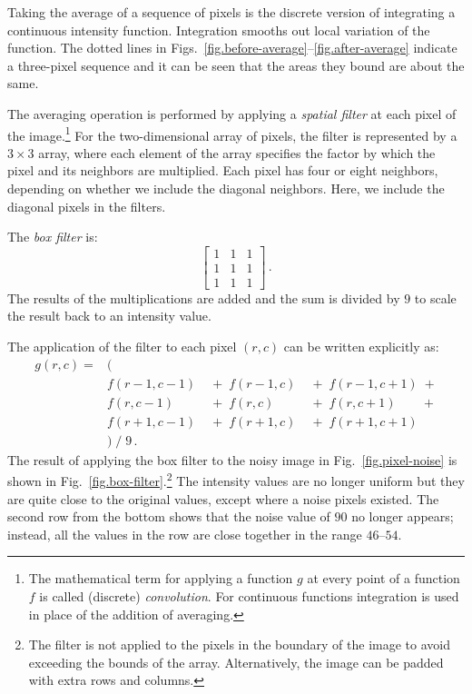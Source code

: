 Taking the average of a sequence of pixels is the discrete version of integrating a continuous intensity function. Integration smooths out local variation of the function. The dotted lines in Figs.~\ref{fig.before-average}--\ref{fig.after-average} indicate a three-pixel sequence and it can be seen that the areas they bound are about the same.

The averaging operation is performed by applying a \emph{spatial filter} at each pixel of the image.\footnote{The mathematical term for applying a function $g$ at every point of a function $f$ is called (discrete) \emph{convolution}. For continuous functions integration is used in place of the addition of averaging.} For the two-dimensional array of pixels, the filter is represented by a $3\times 3$ array, where each element of the array specifies the factor by which the pixel and its neighbors are multiplied. Each pixel has four or eight neighbors, depending on whether we include the diagonal neighbors. Here, we include the diagonal pixels in the filters.

The \emph{box filter} is:
\[
\left[
\begin{array}{ccc}
1 & 1 & 1\\
1 & 1 & 1\\
1 & 1 & 1
\end{array}
\right]\,.
\]
The results of the multiplications are added and the sum is divided by $9$ to scale the result back to an intensity value.

The application of the filter to each pixel $(r,c)$ can be written explicitly as:
\[
\begin{array}{llll}
g(r,c) = &(\\
&f(r-1,c-1) & \;+\; f(r-1,c) & \;+\; f(r-1,c+1) \;+\\
&f(r,c-1) & \;+\; f(r,c) & \;+\; f(r,c+1) \;\;\;\;\;\;\;+\\
&f(r+1,c-1) & \;+\; f(r+1,c) & \;+\; f(r+1,c+1)\\
& ) \; / \; 9\,.
\end{array}
\]
The result of applying the box filter to the noisy image in Fig.~\ref{fig.pixel-noise} is shown in Fig.~\ref{fig.box-filter}.\footnote{The filter is not applied to the pixels in the boundary of the image to avoid exceeding the bounds of the array. Alternatively, the image can be padded with extra rows and columns.} The intensity values are no longer uniform but they are quite close to the original values, except where a noise pixels existed. The second row from the bottom shows that the noise value of $90$ no longer appears; instead, all the values in the row are close together in the range $46$--$54$.

